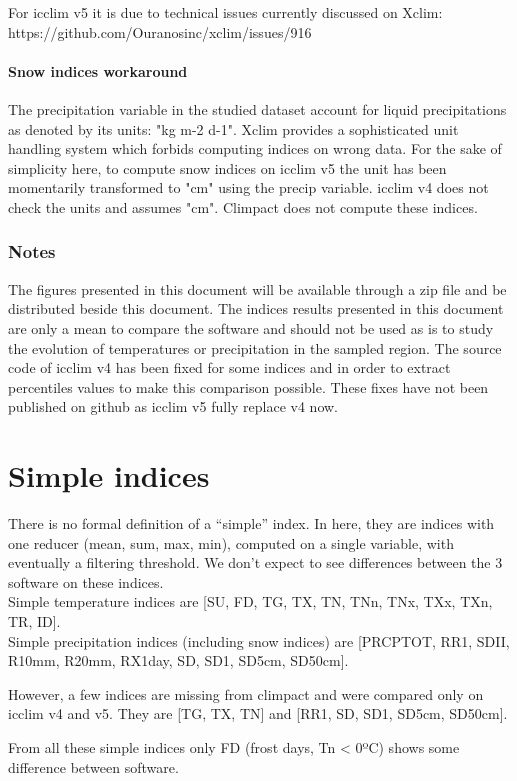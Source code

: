 \documentclass[a4paper,11pt]{article}
\begin{document}
    For icclim v5 it is due to technical issues currently discussed on Xclim: https://github.com/Ouranosinc/xclim/issues/916
\subsection{Snow indices workaround}
    The precipitation variable in the studied dataset account for liquid precipitations as denoted by its units: "kg m-2 d-1".
    Xclim provides a sophisticated unit handling system which forbids computing indices on wrong data. For the sake of simplicity here, to compute snow indices on icclim v5 the unit has been momentarily transformed to "cm" using the precip variable.
    icclim v4 does not check the units and assumes "cm".
    Climpact does not compute these indices.
\section{Notes}
    The figures presented in this document will be available through a zip file and be distributed beside this document.
    The indices results presented in this document are only a mean to compare the software and should not be used as is to study the evolution of temperatures or precipitation in the sampled region.
    The source code of icclim v4 has been fixed for some indices and in order to extract percentiles values to make this comparison possible. These fixes have not been published on github as icclim v5 fully replace v4 now.


\part{Simple indices}
    There is no formal definition of a “simple” index. In here, they are indices with one reducer (mean, sum, max, min), computed on a single variable, with eventually a filtering threshold. We don’t expect to see differences between the 3 software on these indices.\\
    Simple temperature indices are [SU, FD, TG, TX, TN, TNn, TNx, TXx, TXn, TR, ID].\\
    Simple precipitation indices (including snow indices) are [PRCPTOT, RR1, SDII, R10mm, R20mm, RX1day, SD, SD1, SD5cm, SD50cm].

    However, a few indices are missing from climpact and were compared only on icclim v4 and v5. They are [TG, TX, TN] and [RR1, SD, SD1, SD5cm, SD50cm].

    From all these simple indices only FD (frost days, Tn < 0ºC) shows some difference between software.
\end{document}
